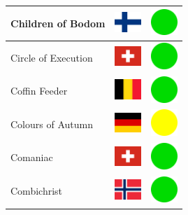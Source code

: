 \documentclass[12pt, a4paper, twoside]{report}
\begin{document}
\begin{center}
\begin{longtable}{|p{5cm}|p{2cm}|p{2cm}|}
Children of Bodom & \includegraphics[width=1cm]{4x3/fi} & \includegraphics[width=1cm]{likes/y} \\ \hline
Circle of Execution & \includegraphics[width=1cm]{4x3/ch} & \includegraphics[width=1cm]{likes/y} \\ \hline
Coffin Feeder & \includegraphics[width=1cm]{4x3/be} & \includegraphics[width=1cm]{likes/y} \\ \hline
Colours of Autumn & \includegraphics[width=1cm]{4x3/de} & \includegraphics[width=1cm]{likes/m} \\ \hline
Comaniac & \includegraphics[width=1cm]{4x3/ch} & \includegraphics[width=1cm]{likes/y} \\ \hline
Combichrist & \includegraphics[width=1cm]{4x3/no} & \includegraphics[width=1cm]{likes/y} \\ \hline

\end{longtable}
\end{center}
\end{document}

